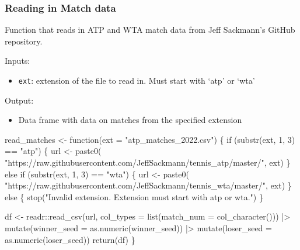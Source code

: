 \documentclass[
  letterpaper,
  DIV=11,
  numbers=noendperiod]{scrartcl}
\newenvironment{Shaded}{\begin{snugshade}}{\end{snugshade}}
\newcommand{\AttributeTok}[1]{\textcolor[rgb]{0.40,0.45,0.13}{#1}}
\newcommand{\ControlFlowTok}[1]{\textcolor[rgb]{0.00,0.23,0.31}{#1}}
\newcommand{\DecValTok}[1]{\textcolor[rgb]{0.68,0.00,0.00}{#1}}
\newcommand{\FunctionTok}[1]{\textcolor[rgb]{0.28,0.35,0.67}{#1}}
\newcommand{\NormalTok}[1]{\textcolor[rgb]{0.00,0.23,0.31}{#1}}
\newcommand{\OtherTok}[1]{\textcolor[rgb]{0.00,0.23,0.31}{#1}}
\newcommand{\SpecialCharTok}[1]{\textcolor[rgb]{0.37,0.37,0.37}{#1}}
\newcommand{\StringTok}[1]{\textcolor[rgb]{0.13,0.47,0.30}{#1}}
\providecommand{\tightlist}{%
  \setlength{\itemsep}{0pt}\setlength{\parskip}{0pt}}\usepackage{longtable,booktabs,array}
\begin{document}
\linespread{2}

\subsubsection{Reading in Match data}\label{reading-in-match-data}

Function that reads in ATP and WTA match data from Jeff Sackmann's
GitHub repository.

Inputs:

\begin{itemize}
\tightlist
\item
  \texttt{ext}: extension of the file to read in. Must start with `atp'
  or `wta'
\end{itemize}

Output:

\begin{itemize}
\tightlist
\item
  Data frame with data on matches from the specified extension
\end{itemize}

\linespread{0.9}

\begin{Shaded}
\begin{Highlighting}[]
\NormalTok{read\_matches }\OtherTok{\textless{}{-}} \ControlFlowTok{function}\NormalTok{(}\AttributeTok{ext =} \StringTok{"atp\_matches\_2022.csv"}\NormalTok{) \{}
  \ControlFlowTok{if}\NormalTok{ (}\FunctionTok{substr}\NormalTok{(ext, }\DecValTok{1}\NormalTok{, }\DecValTok{3}\NormalTok{) }\SpecialCharTok{==} \StringTok{"atp"}\NormalTok{) \{}
\NormalTok{    url }\OtherTok{\textless{}{-}} \FunctionTok{paste0}\NormalTok{(}
      \StringTok{"https://raw.githubusercontent.com/JeffSackmann/tennis\_atp/master/"}\NormalTok{, }
\NormalTok{      ext)}
\NormalTok{  \} }\ControlFlowTok{else} \ControlFlowTok{if}\NormalTok{ (}\FunctionTok{substr}\NormalTok{(ext, }\DecValTok{1}\NormalTok{, }\DecValTok{3}\NormalTok{) }\SpecialCharTok{==} \StringTok{"wta"}\NormalTok{) \{}
\NormalTok{    url }\OtherTok{\textless{}{-}} \FunctionTok{paste0}\NormalTok{(}
      \StringTok{"https://raw.githubusercontent.com/JeffSackmann/tennis\_wta/master/"}\NormalTok{, }
\NormalTok{      ext)}
\NormalTok{  \} }\ControlFlowTok{else}\NormalTok{ \{}
    \FunctionTok{stop}\NormalTok{(}\StringTok{"Invalid extension. Extension must start with \textquotesingle{}atp\textquotesingle{} or \textquotesingle{}wta\textquotesingle{}."}\NormalTok{)}
\NormalTok{  \}}
  
\NormalTok{  df }\OtherTok{\textless{}{-}}\NormalTok{ readr}\SpecialCharTok{::}\FunctionTok{read\_csv}\NormalTok{(url, }\AttributeTok{col\_types =} \FunctionTok{list}\NormalTok{(}\AttributeTok{match\_num =} \FunctionTok{col\_character}\NormalTok{())) }\SpecialCharTok{|\textgreater{}}
    \FunctionTok{mutate}\NormalTok{(}\AttributeTok{winner\_seed =} \FunctionTok{as.numeric}\NormalTok{(winner\_seed)) }\SpecialCharTok{|\textgreater{}}
    \FunctionTok{mutate}\NormalTok{(}\AttributeTok{loser\_seed =} \FunctionTok{as.numeric}\NormalTok{(loser\_seed))}
  \FunctionTok{return}\NormalTok{(df)}
\NormalTok{\}}
\end{Highlighting}
\end{Shaded}
\end{document}
